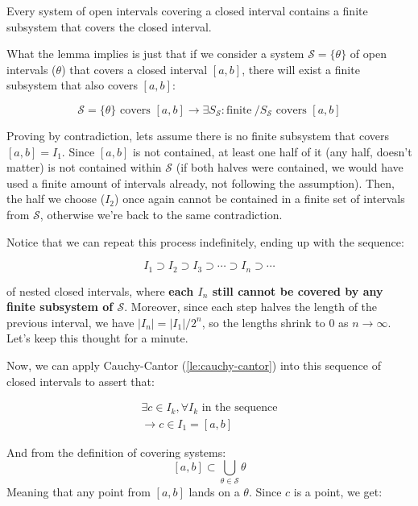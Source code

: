 \begin{lemma}\label{le:borel-lebesgue}
Every system of open intervals covering a closed interval contains a finite subsystem that covers the closed interval.
\end{lemma}

\begin{bookproof}
What the lemma implies is just that if we consider a system $\mathcal{S} = \{\theta\}$ of open intervals ($\theta$) that covers a closed interval $[a,b]$, there will exist a finite subsystem that also covers $[a,b]$:

$$\mathcal{S} = \{\theta\} \text{ covers } [a,b] \rightarrow \exists S_{\mathcal{S}}: \text{finite} \ / S_{\mathcal{S}} \text{ covers } [a,b]$$

Proving by contradiction, lets assume there is no finite subsystem that covers $[a,b] = I_1$. Since $[a,b]$ is not contained, at least one half of it (any half, doesn't matter) is not contained within $\mathcal{S}$ (if both halves were contained, we would have used a finite amount of intervals already, not following the assumption). Then, the half we choose ($I_2$) once again cannot be contained in a finite set of intervals from $\mathcal{S}$, otherwise we're back to the same contradiction.

Notice that we can repeat this process indefinitely, ending up with the sequence:

$$I_1 \supset I_2 \supset I_3 \supset \cdots \supset I_n \supset \cdots$$

of nested closed intervals, where \textbf{each $I_n$ still cannot be covered by any finite subsystem of $\mathcal{S}$}. Moreover, since each step halves the length of the previous interval, we have $|I_n| = |I_1|/2^{n}$, so the lengths shrink to $0$ as $n \to \infty$. Let's keep this thought for a minute.

Now, we can apply Cauchy-Cantor (\cref{le:cauchy-cantor}) into this sequence of closed intervals to assert that:

\begin{align*}
\exists c \in I_k, \forall I_k \text{ in the sequence}\\
\rightarrow c \in I_1 = [a, b]
\end{align*}

And from the definition of covering systems:
$$ [a, b] \subset \bigcup_{\theta \in \mathcal{S}} \theta$$
Meaning that any point from $[a,b]$ lands on a $\theta$. Since $c$ is a point, we get:


\end{bookproof}
